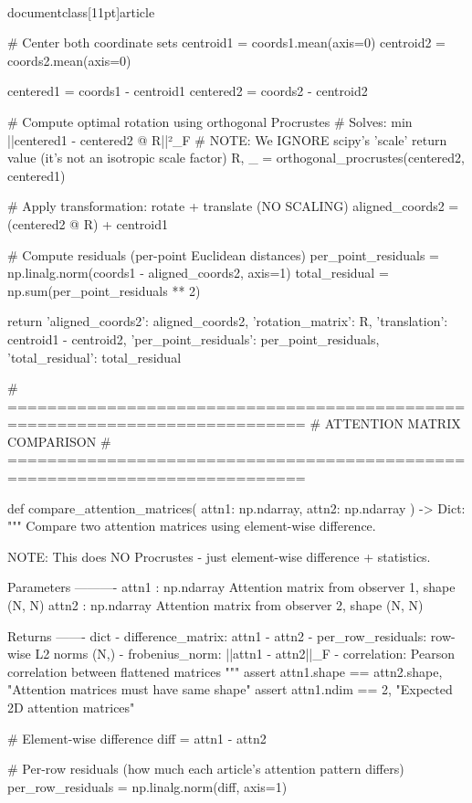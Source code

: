 \\documentclass[11pt]{article}
\begin{document}
\begin{CodeBlock}
    # Center both coordinate sets
    centroid1 = coords1.mean(axis=0)
    centroid2 = coords2.mean(axis=0)
    
    centered1 = coords1 - centroid1
    centered2 = coords2 - centroid2
    
    # Compute optimal rotation using orthogonal Procrustes
    # Solves: min ||centered1 - centered2 @ R||²_F
    # NOTE: We IGNORE scipy's 'scale' return value (it's not an isotropic scale factor)
    R, _ = orthogonal_procrustes(centered2, centered1)
    
    # Apply transformation: rotate + translate (NO SCALING)
    aligned_coords2 = (centered2 @ R) + centroid1
    
    # Compute residuals (per-point Euclidean distances)
    per_point_residuals = np.linalg.norm(coords1 - aligned_coords2, axis=1)
    total_residual = np.sum(per_point_residuals ** 2)
    
    return {
        'aligned_coords2': aligned_coords2,
        'rotation_matrix': R,
        'translation': centroid1 - centroid2,
        'per_point_residuals': per_point_residuals,
        'total_residual': total_residual
    }


# ============================================================================
# ATTENTION MATRIX COMPARISON
# ============================================================================

def compare_attention_matrices(
    attn1: np.ndarray,
    attn2: np.ndarray
) -> Dict:
    """
    Compare two attention matrices using element-wise difference.
    
    NOTE: This does NO Procrustes - just element-wise difference + statistics.
    
    Parameters
    ----------
    attn1 : np.ndarray
        Attention matrix from observer 1, shape (N, N)
    attn2 : np.ndarray
        Attention matrix from observer 2, shape (N, N)
    
    Returns
    -------
    dict
        - difference_matrix: attn1 - attn2
        - per_row_residuals: row-wise L2 norms (N,)
        - frobenius_norm: ||attn1 - attn2||_F
        - correlation: Pearson correlation between flattened matrices
    """
    assert attn1.shape == attn2.shape, "Attention matrices must have same shape"
    assert attn1.ndim == 2, "Expected 2D attention matrices"
    
    # Element-wise difference
    diff = attn1 - attn2
    
    # Per-row residuals (how much each article's attention pattern differs)
    per_row_residuals = np.linalg.norm(diff, axis=1)
    

\end{CodeBlock}
\end{document}
